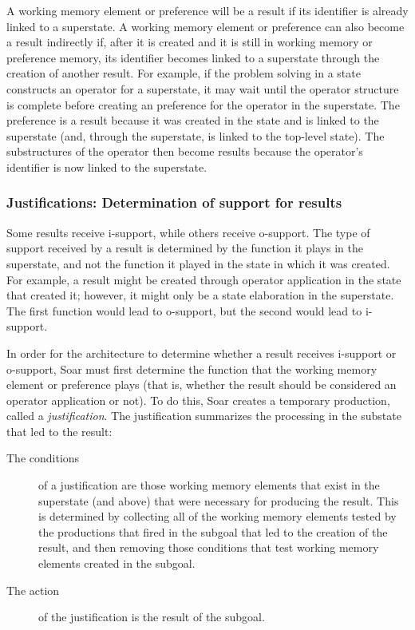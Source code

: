 A working memory element or preference will be a result if
its identifier is already linked to a superstate.
A working memory element or preference can also become a result
indirectly if, after it is created and it is still in working memory or
preference memory, its identifier becomes linked to a superstate through
the creation of another result. For example, if the problem solving in a
state constructs an operator for a superstate, it may wait until
the operator structure is complete before creating an
 preference for the operator in the superstate. The
 preference is a result because it was created in the
state and is linked to the superstate (and, through the superstate, is
linked to the top-level state). The substructures of the operator then
become results because the operator's identifier is now linked to the
superstate. 

\subsubsection*{Justifications: Determination of support for results}

Some results receive i-support, while others receive o-support.  The
type of support received by a result is determined by the function it
plays in the superstate, and not the function it played in the state in
which it was created. For example, a result might be created through
operator application in the state that created it; however, it might
only be a state elaboration in the superstate. The first function would
lead to o-support, but the second would lead to i-support.

In order for the architecture to determine whether a result receives i-support
or o-support, Soar must first determine the function that the working
memory element or preference plays
(that is, whether the result should be considered an operator application or
not). To do this, Soar creates a temporary production, called a
\textit{justification}. The justification summarizes the processing in the
substate that led to the result:\vspace{-10pt}
\begin{description}
\item[The conditions] of a justification are those working memory
elements that exist in the superstate (and above) that were necessary
for producing the result.  This is determined by collecting all of the
working memory elements tested by the productions that fired in the
subgoal that led to the creation of the result, and then removing those
conditions that test working memory elements created in the subgoal.
\vspace{-6pt}
\item[The action] of the justification is the result of the subgoal.
\end{description} 

